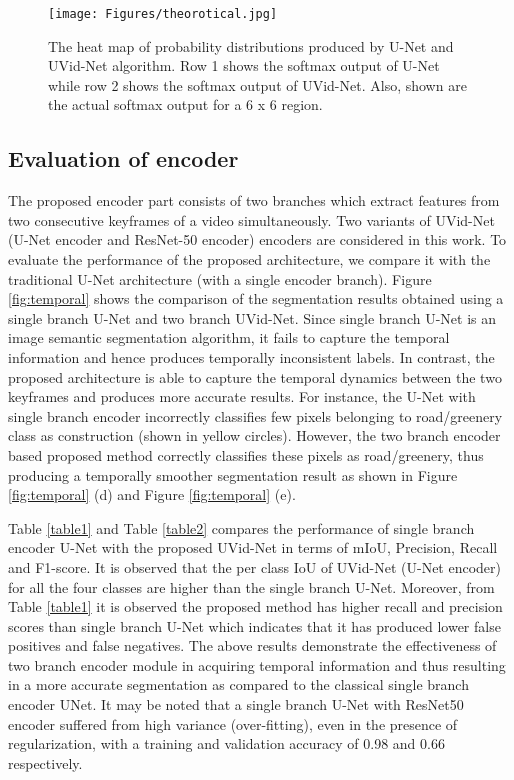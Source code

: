 \documentclass[journal]{IEEEtran}
\begin{document}
\begin{figure}[h]
	\begin{center}
		\texttt{[image: Figures/theorotical.jpg]}
	\end{center}
	\caption{The heat map of probability distributions produced by U-Net and UVid-Net algorithm. Row 1 shows the softmax output of U-Net while row 2 shows the softmax output of UVid-Net. Also, shown are the actual softmax output for a 6 x 6 region.}
	\label{fig:encoder}
\end{figure}

\subsection{Evaluation of encoder}
\label{Sec:TempInfo}

The proposed encoder part consists of two branches which extract features from two consecutive keyframes of a video simultaneously.  Two variants of UVid-Net (U-Net encoder and ResNet-50 encoder) encoders are considered in this work. To evaluate the performance of the proposed architecture, we compare it with the traditional U-Net architecture (with a single encoder branch). Figure \ref{fig:temporal} shows the comparison of the segmentation results obtained using a single branch U-Net and two branch UVid-Net. Since single branch U-Net is an image semantic segmentation algorithm, it fails to capture the temporal information and hence produces temporally inconsistent labels. In contrast, the proposed architecture is able to capture the temporal dynamics between the two keyframes and produces more accurate results. For instance, the U-Net with single branch encoder incorrectly classifies few pixels belonging to road/greenery class as construction (shown in yellow circles).   However, the two branch encoder based proposed method correctly classifies these pixels as road/greenery, thus producing a temporally smoother segmentation result as shown in Figure \ref{fig:temporal} (d) and Figure \ref{fig:temporal} (e). 



Table \ref{table1} and Table  \ref{table2} compares the performance of single branch encoder U-Net with the proposed UVid-Net in terms of mIoU, Precision, Recall and F1-score. It is observed that the per class IoU of UVid-Net (U-Net encoder) for all the four classes are higher than the single branch U-Net. Moreover, from Table \ref{table1} it is observed the proposed method has higher recall and precision scores than single branch U-Net which indicates that it has produced lower false positives and false negatives. The above results demonstrate the effectiveness of two branch encoder module in acquiring temporal information and thus resulting in a more accurate segmentation as compared to the classical single branch encoder UNet. It may be noted that a single branch U-Net with ResNet50 encoder suffered from high variance (over-fitting), even in the presence of regularization, with a training and validation accuracy of 0.98 and 0.66 respectively.  
\end{document}
